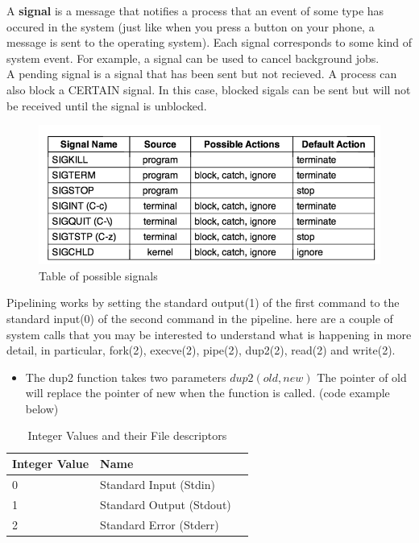 A {\bf signal} is a message that notifies a process that an event of some type has occured in the system (just like when you press a button on your phone, a message is sent to the operating system).  Each signal corresponds to some kind of system event.  For example, a signal can be used to cancel background jobs.\\


A pending signal is a signal that has been sent but not recieved.  A process can also block a CERTAIN signal.  In this case, blocked sigals can be sent
but will not be received until the signal is unblocked.


\begin{figure}[H] %
\begin{center}
\includegraphics[width=0.5\linewidth]{signals}
\end{center}
\caption{Table of possible signals}
\label{fig:example_figure}
\end{figure}




Pipelining works by setting the standard output(1) of the first command to the standard input(0) of the second command in the pipeline.  
here are a couple of system calls that you may be interested to understand what is happening in more detail, in particular, fork(2), 
execve(2), pipe(2), dup2(2), read(2) and write(2).

\begin{itemize}
\item The dup2 function takes two parameters $dup2(old, new)$  The pointer of old will replace the pointer of new when the function is called. (code example below)
\end{itemize}

\begin{table}[H]
\begin{tabular}{l l l}
\toprule
\textbf{Integer Value} & \textbf{Name}  \\
\toprule
0 & Standard Input (Stdin)\\
1 & Standard Output (Stdout) \\
2 & Standard Error (Stderr) \\
\bottomrule
\end{tabular}
\caption{Integer Values and their File descriptors}
\label{tab:treatments_xy}
\end{table}


